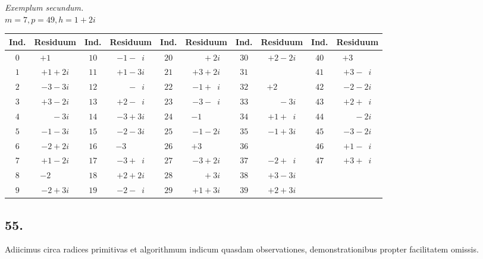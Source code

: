 \documentclass[twoside,12pt, showframe]{memoir}
\begin{document}
\begin{center}
\textit{Exemplum secundum.}\\
\(m=7, p=49, h=1+2 i\)\\
\begin{tabular}{c|c||c|c||c|c||c|c||c|c}
Ind. & Residuum & Ind. & Residuum & Ind. & Residuum & Ind. & Residuum & Ind. & Residuum \\
\hline
\(0\) & \(+1\phantom{\;+0i}\) & \(10\) & \(-1-\phantom{1}i\) & \(20\) & \(\phantom{+0}+2 i\) & \(30\) & \(+2-2 i\) & \(40\) & \(+3\phantom{\;+0i} \)\\[-4pt]
\(1\) & \(+1+2 i\) & \(11\) & \(+1-3 i\) & \(21\) & \(+3+2 i\) & \(31\) & \(\) & \(41\) & \(+3-\phantom{1}i \)\\[-4pt]
\(2\) & \(-3-3 i\) & \(12\) & \(\phantom{+0}-\phantom{1}i\) & \(22\) & \(-1+\phantom{1}i\) & \(32\) & \(+2\phantom{\;+0i}\) & \(42\) & \(-2-2 i \)\\[-4pt]
\(3\) & \(+3-2 i\) & \(13\) & \(+2-\phantom{1}i\) & \(23\) & \(-3-\phantom{1}i\) & \(33\) & \(\phantom{+0}-3 i\) & \(43\) & \(+2+\phantom{1}i \)\\[-4pt]
\(4\) & \(\phantom{+0}-3 i\) & \(14\) & \(-3+3 i\) & \(24\) & \(-1\phantom{\;+0i}\) & \(34\) & \(+1+\phantom{1}i\) & \(44\) & \(\phantom{+0}-2 i \)\\[-4pt]
\(5\) & \(-1-3 i\) & \(15\) & \(-2-3 i\) & \(25\) & \(-1-2 i\) & \(35\) & \(-1+3 i\) & \(45\) & \(-3-2 i \)\\[-4pt]
\(6\) & \(-2+2i\) & \(16\) & \(-3\phantom{\;+0i}\) & \(26\) & \(+3\phantom{\;+0i}\) & \(36\) & \(\) & \(46\) & \(+1-\phantom{1}i \)\\[-4pt]
\(7\) & \(+1-2 i\) & \(17\) & \(-3+\phantom{1}i\) & \(27\) & \(-3+2 i\) & \(37\) & \(-2+\phantom{1}i\) & \(47\) & \(+3+\phantom{1}i \)\\[-4pt]
\(8\) & \(-2\phantom{\;+0i}\) & \(18\) & \(+2+2 i\) & \(28\) & \(\phantom{+0}+3 i\) & \(38\) & \(+3-3 i\) & \multicolumn{2}{c}{}\\[-4pt]
\(9\) & \(-2+3 i\) & \(19\) & \(-2-\phantom{1}i\) & \(29\) & \(+1+3 i\) & \(39\) & \(+2+3 i\) & \multicolumn{2}{c}{}
\end{tabular}
\end{center}

\subsection*{55.}
 
Adiicimus circa radices primitivas et algorithmum indicum quasdam observationes, demonstrationibus propter facilitatem omissis.
 
\end{document}
